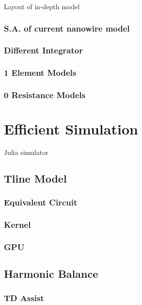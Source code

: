 \documentclass{article}
\begin{document}
Layout of in-depth model

\subsubsection{S.A. of current nanowire model}

\subsubsection{Different Integrator}

\subsubsection{1 Element Models}

\subsubsection{0 Resistance Models}

\section{Efficient Simulation}

Julia simulator

\subsection{Tline Model}

\subsubsection{Equivalent Circuit}

\subsubsection{Kernel}

\subsubsection{GPU}

\subsection{Harmonic Balance}

\subsubsection{TD Assist}
\end{document}

